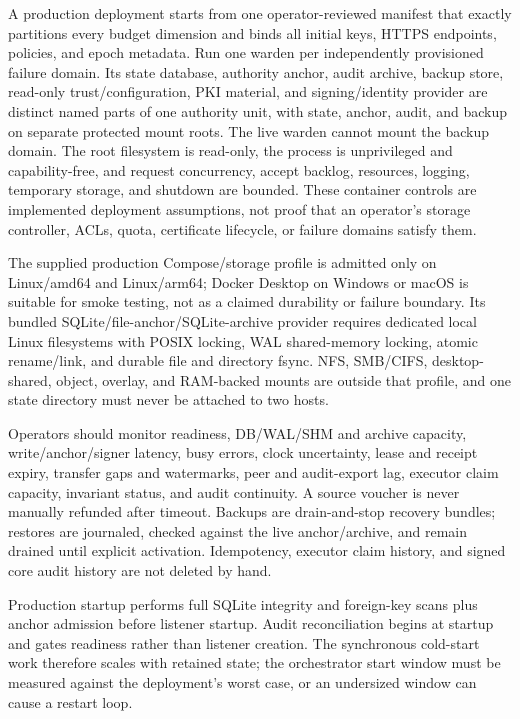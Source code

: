 \documentclass[10pt]{article}
\begin{document}
A production deployment starts from one operator-reviewed manifest that exactly partitions every
budget dimension and binds all initial keys, HTTPS endpoints, policies, and epoch metadata. Run
one warden per independently provisioned failure domain. Its state database, authority anchor,
audit archive, backup store, read-only trust/configuration, PKI material, and signing/identity
provider are distinct named parts of one authority unit, with state, anchor, audit, and backup on
separate protected mount roots. The live warden cannot mount the backup domain. The root filesystem
is read-only, the process is unprivileged and capability-free, and request concurrency, accept
backlog, resources, logging, temporary storage, and shutdown are bounded. These container controls
are implemented deployment assumptions, not proof that an operator's storage controller, ACLs,
quota, certificate lifecycle, or failure domains satisfy them.

The supplied production Compose/storage profile is admitted only on Linux/amd64 and Linux/arm64;
Docker Desktop on Windows or macOS is suitable for smoke testing, not as a claimed durability or
failure boundary. Its bundled SQLite/file-anchor/SQLite-archive provider requires dedicated local
Linux filesystems with POSIX locking, WAL shared-memory locking, atomic rename/link, and durable
file and directory fsync. NFS, SMB/CIFS, desktop-shared, object, overlay, and RAM-backed mounts are
outside that profile, and one state directory must never be attached to two hosts.

Operators should monitor readiness, DB/WAL/SHM and archive capacity, write/anchor/signer latency,
busy errors, clock uncertainty, lease and receipt expiry, transfer gaps and watermarks, peer and
audit-export lag, executor claim capacity, invariant status, and audit continuity. A source voucher
is never manually refunded after timeout. Backups are drain-and-stop recovery bundles; restores
are journaled, checked against the live anchor/archive, and remain drained until explicit
activation. Idempotency, executor claim history, and signed core audit history are not deleted by
hand.

Production startup performs full SQLite integrity and foreign-key scans plus anchor admission
before listener startup. Audit reconciliation begins at startup and gates readiness rather than
listener creation. The synchronous cold-start work therefore scales with retained state; the
orchestrator start window must be measured against the deployment's worst case, or an undersized
window can cause a restart loop.
\end{document}
